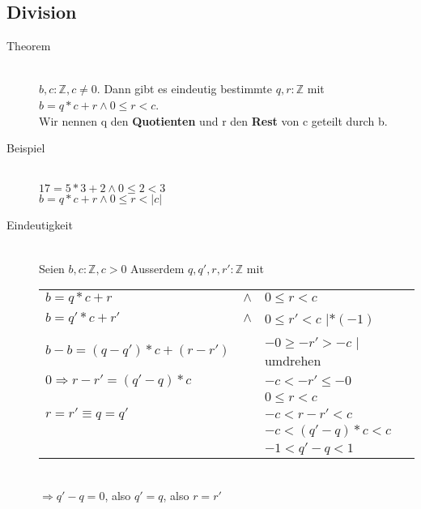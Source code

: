 \documentclass[a4paper,10pt]{article}
\newcommand{\ZN}{\mathbb{Z}} %
\newcommand{\Bold}[1]{\textbf{#1}} %
\newcommand{\Ra}{\Rightarrow}
\begin{document}
\subsection{Division}
\begin{description}
	\item[Theorem] \hfill \\
		$b, c:\ZN, c \neq 0$. Dann gibt es eindeutig bestimmte $q,r : \ZN$ mit $b=q*c+r \wedge 0 \leq r < c$. \\
		Wir nennen q den \Bold {Quotienten} und r den \Bold {Rest} von c geteilt durch b.
	\item[Beispiel] \hfill \\
		$17=5*3+2 \wedge 0 \leq 2 < 3$ \\
		$b=q*c+r \wedge 0 \leq r < |c|$
	\item[Eindeutigkeit] \hfill \\
		Seien $b,c : \ZN, c > 0$ Ausserdem $q,q',r,r':\ZN$ mit \\
		\begin{tabular}{l c l}
			$b=q*c + r$ & $\wedge$ & $0 \leq r < c$ \\
			$b=q'*c+r'$ & $\wedge$ & $0 \leq r' < c$ $| *(-1)$ \\
			\hline
			$b-b = (q-q') * c + (r-r')$ & & $-0 \geq -r' > -c$ $|$ umdrehen \\
			$0 \Ra r-r'=(q'-q) *c$ && $-c < -r' \leq -0$\\
			&& $0 \leq r < c$ \\
			\hline
			$r=r' \equiv q = q'$ && $-c < r-r' < c$ \\
			&& $-c < (q'-q)*c<c$ \\
			&& $-1 < q' - q < 1$ \\
		\end{tabular} \\
	$\Ra q'-q =0$, also $q'=q$, also $r=r'$ \\
		
\end{description}
\end{document}
